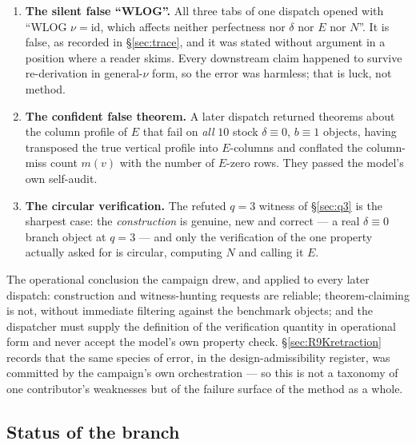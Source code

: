 \documentclass[11pt]{article}
\theoremstyle{plain}
\theoremstyle{definition}
\theoremstyle{remark}
\numberwithin{equation}{section}
\begin{document}
\begin{enumerate}
\item \textbf{The silent false ``WLOG''.} All three tabs of one dispatch opened
with ``WLOG $\nu = \mathrm{id}$, which affects neither perfectness nor $\delta$
nor $E$ nor $N$''. It is false, as recorded in \S\ref{sec:trace}, and it was
stated without argument in a position where a reader skims. Every downstream claim
happened to survive re-derivation in general-$\nu$ form, so the error was
harmless; that is luck, not method.
\item \textbf{The confident false theorem.} A later dispatch returned theorems
about the column profile of $E$ that fail on \emph{all} $10$ stock
$\delta\equiv0$, $b\equiv1$ objects, having transposed the true vertical profile
into $E$-columns and conflated the column-miss count $m(v)$ with the number of
$E$-zero rows. They passed the model's own self-audit.
\item \textbf{The circular verification.} The refuted $q = 3$ witness of
\S\ref{sec:q3} is the sharpest case: the \emph{construction} is genuine, new and
correct --- a real $\delta\equiv0$ branch object at $q = 3$ --- and only the
verification of the one property actually asked for is circular, computing $N$ and
calling it $E$.
\end{enumerate}

The operational conclusion the campaign drew, and applied to every later dispatch:
construction and witness-hunting requests are reliable; theorem-claiming is not,
without immediate filtering against the benchmark objects; and the dispatcher must
supply the definition of the verification quantity in operational form and never
accept the model's own property check. \S\ref{sec:R9Kretraction} records that the
same species of error, in the design-admissibility register, was committed by the
campaign's own orchestration --- so this is not a taxonomy of one contributor's
weaknesses but of the failure surface of the method as a whole.

\subsection{Status of the branch}\label{sec:branchstatus}
\end{document}
